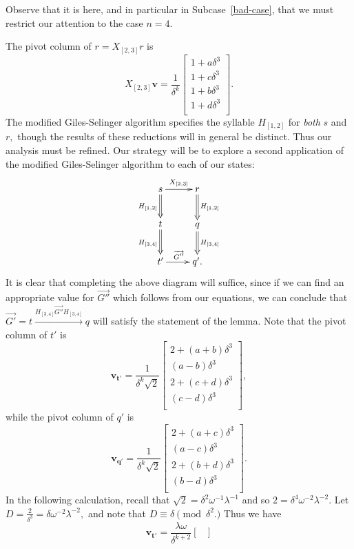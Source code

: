 \documentclass{dalthesis}
\theoremstyle{theorem}
\theoremstyle{definition}
\theoremstyle{definition}  %
\theoremstyle{definition}
\renewcommand{\:}{\mathbin{:}}
\newcommand{\edge}{\xrightarrow}
\renewcommand{\vec}{\overrightarrow}
\begin{document}
\begin{description}
\begin{description}
Observe that it is here, and in particular in Subcase~\ref{bad-case}, that we must restrict our attention to the case $n=4.$ 

The pivot column of $r = X_{[2,3]}r$ is \[
X_{[2,3]}\boldsymbol{v}=\frac{1}{\delta^k}\begin{bmatrix}
	1+a\delta^3\\
	1+c\delta^3\\
	1+b\delta^3\\
	1+d\delta^3\\
\end{bmatrix}.
\]
The modified Giles-Selinger algorithm specifies the syllable $H_{[1,2]}$ for \textit{both} $s$ and $r,$ though the results of these reductions will in general be distinct. Thus our analysis must be refined. Our strategy will be to explore a second application of the modified Giles-Selinger algorithm to each of our states: \[ \xymatrix{
        s \ar@{=>}[d]_{H_{[1,2]}} \ar[r]^{X_{[2,3]}} &
        r \ar@{=>}[d]^{H_{[1,2]}} \\
        t \ar@{=>}[d]_{H_{[3,4]}} &
        q \ar@{=>}[d]^{H_{[3,4]}} \\
        t' \ar@{->}[r]^{\vec{G''}}&
        q'.
      }
      \]
It is clear that completing the above diagram will suffice, since if we can find an appropriate value for $\vec{G''}$ which follows from our equations, we can conclude that $\vec{G'} = t\edge{H_{[3,4]}\vec{G''}H_{[3,4]}}q$ will satisfy the statement of the lemma. Note that the pivot column of $t'$ is \[\boldsymbol{v_{t'}}=\frac{1}{\delta^k\sqrt{2}}\begin{bmatrix}
	2 + (a+b)\delta^3\\
	(a-b)\delta^3\\
	2 + (c+d)\delta^3\\
	(c-d)\delta^3\\
\end{bmatrix},\]
while the pivot column of $q'$ is \[\boldsymbol{v_{q'}}=\frac{1}{\delta^k\sqrt{2}}\begin{bmatrix}
	2 + (a+c)\delta^3\\
	(a-c)\delta^3\\
	2 + (b+d)\delta^3\\
	(b-d)\delta^3\\
\end{bmatrix}.\]
In the following calculation, recall that $\sqrt{2}=\delta^2\omega^{-1}\lambda^{-1}$ and so $2 = \delta^4\omega^{-2}\lambda^{-2}.$ Let $D = \frac{2}{\delta^3} = \delta\omega^{-2}\lambda^{-2},$ and note that $D\equiv\delta\pmod{\delta^2.}$ Thus we have \[\boldsymbol{v_{t'}}=\frac{\lambda\omega}{\delta^{k+2}}\begin{bmatrix}

\end{bmatrix}\]
\end{description}
\end{description}
\end{document}
